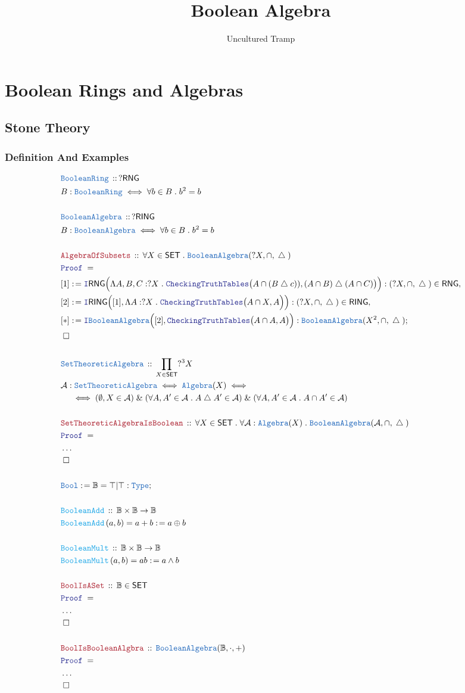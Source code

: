 \documentclass[12pt]{scrartcl}
\author{Uncultured Tramp}
\title{Boolean Algebra}
\newcommand{\TYPE}[1]{\textcolor{NavyBlue}{\mathtt{#1}}}
\newcommand{\FUNC}[1]{\textcolor{Cerulean}{\mathtt{#1}}}
\newcommand{\LOGIC}[1]{\textcolor{Blue}{\mathtt{#1}}}
\newcommand{\THM}[1]{\textcolor{Maroon}{\mathtt{#1}}}
\renewcommand{\.}{\; . \;}
\newcommand{\de}{: \kern 0.1pc =}
\newcommand{\Act}[1]{\left( #1 \right)}
\newcommand{\Theorem}[2]{& \THM{#1} \, :: \, #2 \\ & \Proof = \\ }
\newcommand{\DeclareType}[2]{& \TYPE{#1} \, :: \, #2 \\}
\newcommand{\DefineType}[3]{& #1 : \TYPE{#2} \iff #3 \\}
\newcommand{\DefineNamedType}[4]{& #1 : \TYPE{#2} \iff #3 \iff #4 \\}
\newcommand{\DeclareFunc}[2]{& \FUNC{#1} \, :: \, #2 \\}
\newcommand{\DefineNamedFunc}[4]{&  \FUNC{#1}\Act{#2} = #3 \de #4 \\}
\newcommand{\NewLine}{\\ & \kern 1pc}
\newcommand{\Page}[1]{ \begin{align*} #1 \end{align*}   }
\newcommand{\NoProof}{ & \ldots \\ \EndProof}
\renewcommand{\And}{\; \& \;}
\newcommand{\Intro}{\LOGIC{I}}
\newcommand{\Type}{\TYPE{Type}}
\newcommand{\du}{\; \triangle \;}
\newcommand{\Say}[3]{& #1 \de #2 : #3, \\}
\newcommand{\Conclude}[3]{& #1 \de #2 : #3; \\}
\newcommand{\QED}{\; \square}
\newcommand{\EndProof}{& \QED \\}
\newcommand{\Proof}{\LOGIC{Proof} \; }
\newcommand{\A}{\mathcal{A}}
\newcommand{\SET}{\mathsf{SET}}
\newcommand{\RING}{\mathsf{RING}}
\newcommand{\RNG}{\mathsf{RNG}}
\newcommand{\Bool}{\mathbb{B}}
\newcommand{\Alg}{\TYPE{Algebra}}
\newcommand{\BA}{\TYPE{BooleanAlgebra}}
\begin{document}
\maketitle
\newpage
\tableofcontents
\newpage
\section{Boolean Rings and Algebras}
\subsection{Stone Theory}
\subsubsection{Definition And Examples}
\Page{
	\DeclareType{BooleanRing}{?\RNG}
	\DefineType{B}{BooleanRing}{\forall b \in B \. b^2 = b}
	\\
	\DeclareType{BooleanAlgebra}{?\RING}
	\DefineType{B}{BooleanAlgebra}{\forall b \in B \. b^2 = b}
	\\
	\Theorem{AlgebraOfSubsets}
	{
		\forall X \in \SET \.   
		\BA(?X, \cap  ,\du)
	}
	\Say{[1]}{
		\Intro \RNG \Big( 
			\Lambda A,B,C : ?X \. 
			\LOGIC{CheckingTruthTables}\big(A \cap (B \du c) ), (A \cap B) \du (A \cap C)\big)  
		\Big)
	}
	{
		(?X,\cap,\du) \in \RNG
	}
	\Say{[2]}{\Intro \RING 
		\Big( 
			[1],
			\Lambda A : ?X \. \LOGIC{CheckingTruthTables}\big(  A \cap X, A \Big)
		\Big)
		}
	{
		(?X,\cap,\du) \in \RING
	}
	\Conclude{[*]}{ 
		\Intro \BA \Big( 
			[2], 
			\LOGIC{CheckingTruthTables}\big( A \cap A, A \big)   
		\Big)  
	}
	{
		\BA(X^2,\cap,\du)
	}
	\EndProof
	\\
	\DeclareType{SetTheoreticAlgebra}{\prod_{X \in \SET} ?^3X}
	\DefineNamedType{\A}{SetTheoreticAlgebra}{\TYPE{Algebra}(X)}
	{
		\NewLine \iff
		(\emptyset,X \in \A) 
		\And
		( \forall A,A' \in \A \. A \du A' \in \A)
		\And
		( \forall A,A' \in \A \. A \cap A' \in \A)
	}   
	\\
	\Theorem{SetTheoreticAlgebraIsBoolean}
	{
		\forall X \in \SET \.
		\forall \A : \Alg(X) \. 
		\BA(\A,\cap,\du)
	}
	\NoProof
	\\
	\Conclude{\TYPE{Bool}}{\Bool = \top |\top}{\Type}
	\\
	\DeclareFunc{BooleanAdd}{\Bool \times \Bool \to \Bool}
	\DefineNamedFunc{BooleanAdd}{a,b}{a + b}{a \oplus b}
	\\
	\DeclareFunc{BooleanMult}{\Bool \times \Bool \to \Bool}
	\DefineNamedFunc{BooleanMult}{a,b}{ab}{a \wedge b}
	\\
	\Theorem{BoolIsASet}{\Bool \in \SET}
	\NoProof
	\\
	\Theorem{BoolIsBooleanAlgbra}{\BA(\Bool,\cdot,+)}
	\NoProof
}
\end{document}
